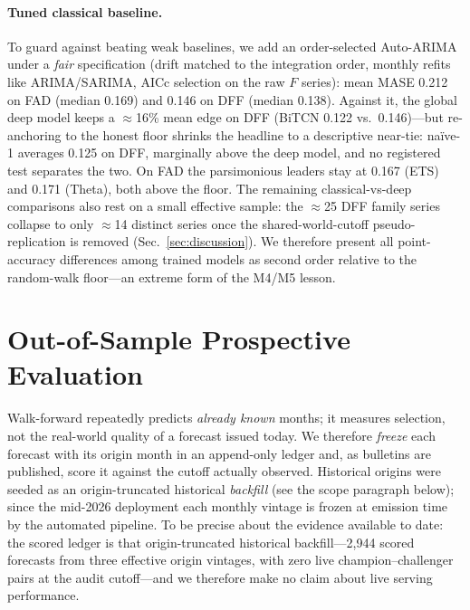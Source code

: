 \documentclass[runningheads]{llncs}
\begin{document}
\paragraph{Tuned classical baseline.} To guard against beating weak baselines, we
add an order-selected Auto-ARIMA under a \emph{fair} specification (drift matched
to the integration order, monthly refits like ARIMA/SARIMA, AICc selection on the
raw $F$ series): mean MASE 0.212 on FAD (median 0.169) and 0.146 on DFF (median
0.138). Against it, the global deep model keeps a $\approx$16\% mean edge on DFF (BiTCN
0.122 vs.\ 0.146)---but re-anchoring to the honest floor shrinks the headline to a
descriptive near-tie: naïve-1 averages 0.125 on DFF, marginally above the deep model,
and no registered test separates the two. On FAD the parsimonious leaders stay at 0.167
(ETS) and 0.171 (Theta), both above the floor. The
remaining classical-vs-deep comparisons also rest on a small effective sample: the
$\approx$25 DFF family series collapse to only $\approx$14 distinct series once the
shared-world-cutoff pseudo-replication is removed (Sec.~\ref{sec:discussion}). We
therefore present all point-accuracy differences among trained models as second
order relative to the random-walk floor---an extreme form of the M4/M5 lesson.
\section{Out-of-Sample Prospective Evaluation}
\label{sec:prospective}

Walk-forward repeatedly predicts \emph{already known} months; it measures
selection, not the real-world quality of a forecast issued today. We therefore
\emph{freeze} each forecast with its origin month in an append-only ledger and,
as bulletins are published, score it against the cutoff actually observed.
Historical origins were seeded as an origin-truncated historical \emph{backfill}
(see the scope paragraph below); since the mid-2026 deployment each monthly vintage
is frozen at emission time by the automated pipeline. To be precise about the
evidence available to date: the scored ledger is that origin-truncated historical
backfill---2{,}944 scored forecasts from three effective origin vintages, with zero
live champion--challenger pairs at the audit cutoff---and we therefore make no claim
about live serving performance.
\end{document}
